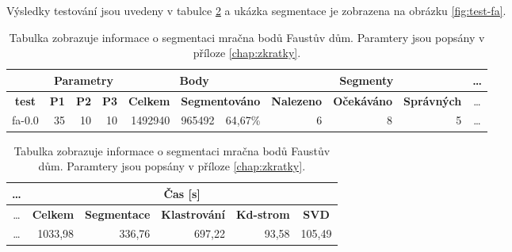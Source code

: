 \documentclass[11pt,twoside,a4paper]{book}
\begin{document}
Výsledky testování jsou uvedeny v tabulce \ref{table:test-fa} a ukázka segmentace je zobrazena na obrázku \ref{fig:test-fa}.

\begin{table}[ht]
\resizebox{\textwidth}{!} {
\begin{tabular}{|l|r|r|r|r|r|r|r|r|r|c|}
\hline
\textbf{} & \multicolumn{ 3}{c|}{\textbf{Parametry}} & \multicolumn{ 3}{c|}{\textbf{Body}} & \multicolumn{ 3}{c|}{\textbf{Segmenty}} &\ldots \\ \hline
\multicolumn{1}{|c|}{\textbf{test}} & \textbf{P1} & \multicolumn{1}{c|}{\textbf{P2}} & \multicolumn{1}{c|}{\textbf{P3}} & \textbf{Celkem} & \multicolumn{ 2}{c|}{\textbf{Segmentováno}} & \textbf{Nalezeno} & \multicolumn{1}{c|}{\textbf{Očekáváno }} & \multicolumn{1}{c|}{\textbf{Správných}} &\ldots\\ \hline
fa-0.0 & \multicolumn{1}{r|}{35} & \multicolumn{1}{r|}{10} & \multicolumn{1}{r|}{10} & \multicolumn{1}{r|}{1492940} & \multicolumn{1}{r|}{965492} & \multicolumn{1}{r|}{64,67\%} & \multicolumn{1}{r|}{6} & \multicolumn{1}{r|}{8} & \multicolumn{1}{r|}{5} &\ldots\\ \hline
\end{tabular}

}
\begin{flushright} \scalebox{0.9} {
\begin{tabular}{|c|r|r|r|r|r|}
\hline
\ldots& \multicolumn{ 5}{|c|}{\textbf{Čas [s]}} \\ \hline
\ldots& \textbf{Celkem} & \multicolumn{1}{c|}{\textbf{Segmentace}} & \multicolumn{1}{c|}{\textbf{Klastrování}} & \multicolumn{1}{c|}{\textbf{Kd-strom}} & \multicolumn{1}{c|}{\textbf{SVD}} \\ \hline
\ldots& \multicolumn{1}{|r|}{1033,98} & \multicolumn{1}{r|}{336,76} & \multicolumn{1}{r|}{697,22} & \multicolumn{1}{r|}{93,58} & \multicolumn{1}{r|}{105,49} \\ \hline
\end{tabular}
}\end{flushright}

\caption{Tabulka zobrazuje informace o segmentaci mračna bodů Faustův dům. Paramtery jsou popsány v příloze \ref{chap:zkratky}.} 
\label{table:test-fa}
\end{table}
\end{document}
